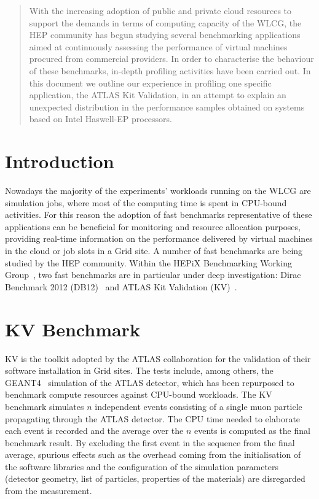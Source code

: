 \begin{abstract}
With the increasing adoption of public and private cloud resources to support
the demands in terms of computing capacity of the WLCG, the HEP community has begun
studying several benchmarking applications aimed at continuously assessing the
performance of virtual machines procured from commercial providers.
In order to characterise the behaviour of these benchmarks, in-depth
profiling activities have been carried out. In this document we outline
our experience in profiling one specific application, the ATLAS Kit Validation,
in an attempt to explain an unexpected distribution in the performance samples
obtained on systems based on Intel Haswell-EP processors.
\end{abstract}


\section{Introduction}
Nowadays the majority of the experiments' workloads running on the WLCG are simulation 
jobs, where most of the computing time is spent in CPU-bound activities. For this 
reason the adoption of fast benchmarks representative of these applications
can be beneficial for monitoring and resource allocation purposes,
providing real-time information on the performance delivered by virtual 
machines in the cloud or job slots in a Grid site.
A number of fast benchmarks are being studied by the HEP community. Within the 
HEPiX Benchmarking Working Group~\cite{HEPiX:2014:HEPiX}, two fast benchmarks are 
in particular under deep investigation: Dirac Benchmark 2012 (DB12)~\cite{CERN:2016:DB12} 
and ATLAS Kit Validation (KV)~\cite{KV}.

\section{KV Benchmark}
KV is the toolkit adopted by the ATLAS collaboration for the
validation of their software installation in Grid sites. The tests include, among
others, the GEANT4~\cite{GEANT4} simulation of the ATLAS detector, which
has been repurposed to benchmark compute resources against CPU-bound 
workloads. The KV benchmark simulates $n$ independent events consisting of a single muon particle 
propagating through the ATLAS detector. The CPU time needed to elaborate each event 
is recorded and the average over the $n$ events is computed as the final benchmark result.
By excluding the first event in the sequence from the final average, spurious effects such as the 
overhead coming from the initialisation of the software libraries and the configuration 
of the simulation parameters (detector geometry, list of particles, properties of 
the materials) are disregarded from the measurement.

